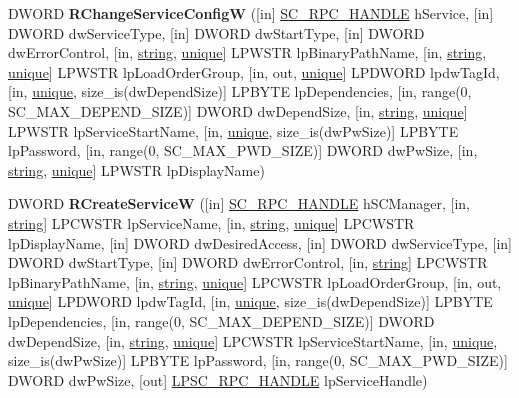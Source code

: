 \begin{DoxyCompactItemize}
\item 
\mbox{\label{interfacesvcctl_a95b224e8a469df9a8c045919c22079f2}} 
D\+W\+O\+RD {\bfseries R\+Change\+Service\+ConfigW} (\mbox{[}in\mbox{]} \hyperlink{interfacevoid}{S\+C\+\_\+\+R\+P\+C\+\_\+\+H\+A\+N\+D\+LE} h\+Service, \mbox{[}in\mbox{]} D\+W\+O\+RD dw\+Service\+Type, \mbox{[}in\mbox{]} D\+W\+O\+RD dw\+Start\+Type, \mbox{[}in\mbox{]} D\+W\+O\+RD dw\+Error\+Control, \mbox{[}in, \hyperlink{structstring}{string}, \hyperlink{interfaceunique}{unique}\mbox{]} L\+P\+W\+S\+TR lp\+Binary\+Path\+Name, \mbox{[}in, \hyperlink{structstring}{string}, \hyperlink{interfaceunique}{unique}\mbox{]} L\+P\+W\+S\+TR lp\+Load\+Order\+Group, \mbox{[}in, out, \hyperlink{interfaceunique}{unique}\mbox{]} L\+P\+D\+W\+O\+RD lpdw\+Tag\+Id, \mbox{[}in, \hyperlink{interfaceunique}{unique}, size\+\_\+is(dw\+Depend\+Size)\mbox{]} L\+P\+B\+Y\+TE lp\+Dependencies, \mbox{[}in, range(0, S\+C\+\_\+\+M\+A\+X\+\_\+\+D\+E\+P\+E\+N\+D\+\_\+\+S\+I\+ZE)\mbox{]} D\+W\+O\+RD dw\+Depend\+Size, \mbox{[}in, \hyperlink{structstring}{string}, \hyperlink{interfaceunique}{unique}\mbox{]} L\+P\+W\+S\+TR lp\+Service\+Start\+Name, \mbox{[}in, \hyperlink{interfaceunique}{unique}, size\+\_\+is(dw\+Pw\+Size)\mbox{]} L\+P\+B\+Y\+TE lp\+Password, \mbox{[}in, range(0, S\+C\+\_\+\+M\+A\+X\+\_\+\+P\+W\+D\+\_\+\+S\+I\+ZE)\mbox{]} D\+W\+O\+RD dw\+Pw\+Size, \mbox{[}in, \hyperlink{structstring}{string}, \hyperlink{interfaceunique}{unique}\mbox{]} L\+P\+W\+S\+TR lp\+Display\+Name)
\item 
\mbox{\label{interfacesvcctl_a2ca78d7b20d6d33bc3bbbb7e8f0925bf}} 
D\+W\+O\+RD {\bfseries R\+Create\+ServiceW} (\mbox{[}in\mbox{]} \hyperlink{interfacevoid}{S\+C\+\_\+\+R\+P\+C\+\_\+\+H\+A\+N\+D\+LE} h\+S\+C\+Manager, \mbox{[}in, \hyperlink{structstring}{string}\mbox{]} L\+P\+C\+W\+S\+TR lp\+Service\+Name, \mbox{[}in, \hyperlink{structstring}{string}, \hyperlink{interfaceunique}{unique}\mbox{]} L\+P\+C\+W\+S\+TR lp\+Display\+Name, \mbox{[}in\mbox{]} D\+W\+O\+RD dw\+Desired\+Access, \mbox{[}in\mbox{]} D\+W\+O\+RD dw\+Service\+Type, \mbox{[}in\mbox{]} D\+W\+O\+RD dw\+Start\+Type, \mbox{[}in\mbox{]} D\+W\+O\+RD dw\+Error\+Control, \mbox{[}in, \hyperlink{structstring}{string}\mbox{]} L\+P\+C\+W\+S\+TR lp\+Binary\+Path\+Name, \mbox{[}in, \hyperlink{structstring}{string}, \hyperlink{interfaceunique}{unique}\mbox{]} L\+P\+C\+W\+S\+TR lp\+Load\+Order\+Group, \mbox{[}in, out, \hyperlink{interfaceunique}{unique}\mbox{]} L\+P\+D\+W\+O\+RD lpdw\+Tag\+Id, \mbox{[}in, \hyperlink{interfaceunique}{unique}, size\+\_\+is(dw\+Depend\+Size)\mbox{]} L\+P\+B\+Y\+TE lp\+Dependencies, \mbox{[}in, range(0, S\+C\+\_\+\+M\+A\+X\+\_\+\+D\+E\+P\+E\+N\+D\+\_\+\+S\+I\+ZE)\mbox{]} D\+W\+O\+RD dw\+Depend\+Size, \mbox{[}in, \hyperlink{structstring}{string}, \hyperlink{interfaceunique}{unique}\mbox{]} L\+P\+C\+W\+S\+TR lp\+Service\+Start\+Name, \mbox{[}in, \hyperlink{interfaceunique}{unique}, size\+\_\+is(dw\+Pw\+Size)\mbox{]} L\+P\+B\+Y\+TE lp\+Password, \mbox{[}in, range(0, S\+C\+\_\+\+M\+A\+X\+\_\+\+P\+W\+D\+\_\+\+S\+I\+ZE)\mbox{]} D\+W\+O\+RD dw\+Pw\+Size, \mbox{[}out\mbox{]} \hyperlink{interfacevoid}{L\+P\+S\+C\+\_\+\+R\+P\+C\+\_\+\+H\+A\+N\+D\+LE} lp\+Service\+Handle)

\end{DoxyCompactItemize}
